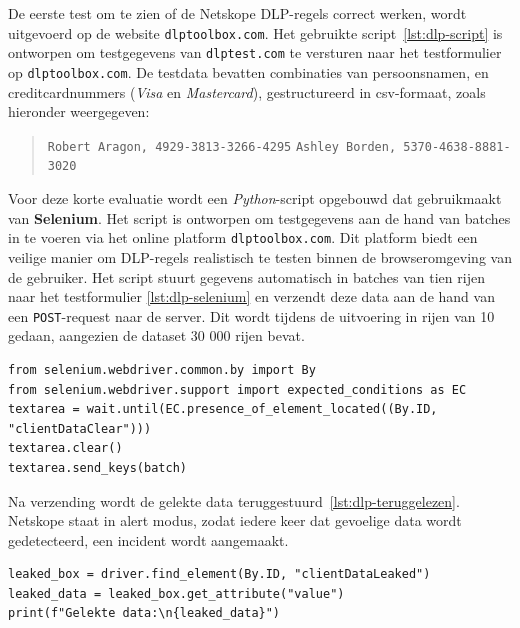 De eerste test om te zien of de Netskope DLP-regels correct werken, wordt uitgevoerd op de website \texttt{dlptoolbox.com}.
Het gebruikte script~\ref{lst:dlp-script} is ontworpen om testgegevens van \texttt{dlptest.com} te versturen naar het testformulier op \texttt{dlptoolbox.com}.
De testdata bevatten combinaties van persoonsnamen, en creditcardnummers (\textit{Visa} en \textit{Mastercard}), gestructureerd in \gls{csv}-formaat, zoals hieronder weergegeven:

\begin{quote}\small
\texttt{Robert Aragon, 4929-3813-3266-4295} \newline
\texttt{Ashley Borden, 5370-4638-8881-3020}
\end{quote}

Voor deze korte evaluatie wordt een \textit{Python}-script opgebouwd dat gebruikmaakt van \textbf{Selenium}. 
Het script is ontworpen om testgegevens aan de hand van batches in te voeren via het online platform \texttt{dlptoolbox.com}.
Dit platform biedt een veilige manier om DLP-regels realistisch te testen binnen de browseromgeving van de gebruiker.
Het script stuurt gegevens automatisch in batches van tien rijen naar het testformulier \ref{lst:dlp-selenium} en verzendt deze data aan de hand van een \texttt{POST}-request naar de server.
Dit wordt tijdens de uitvoering in rijen van 10 gedaan, aangezien de dataset \autocite{DLPTest2025Sample} 30 000 rijen bevat.

{\small
\begin{lstlisting}[style=custompython,caption={Versturen van batches via Selenium},label={lst:dlp-selenium}, captionpos=b, basicstyle=\small\ttfamily]
from selenium.webdriver.common.by import By
from selenium.webdriver.support import expected_conditions as EC
textarea = wait.until(EC.presence_of_element_located((By.ID, "clientDataClear")))
textarea.clear()
textarea.send_keys(batch)
\end{lstlisting}
}

Na verzending wordt de gelekte data teruggestuurd~\ref{lst:dlp-teruggelezen}. Netskope staat in alert modus, zodat iedere keer dat gevoelige data wordt gedetecteerd, een incident wordt aangemaakt. 

{\small
\begin{lstlisting}[style=custompython, caption={Verzonden data wordt teruggelezen},label={lst:dlp-teruggelezen}, captionpos=b, basicstyle=\small\ttfamily]
leaked_box = driver.find_element(By.ID, "clientDataLeaked")
leaked_data = leaked_box.get_attribute("value")
print(f"Gelekte data:\n{leaked_data}")
\end{lstlisting}
}

